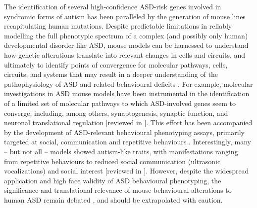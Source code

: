The identification of several high-confidence ASD-risk genes involved in
syndromic forms of autism \parencite{sanders2015} has been paralleled by the
generation of mouse lines recapitulating human mutations. Despite predictable
limitations in reliably modelling the full phenotypic spectrum of a complex (and
possibly only human) developmental disorder like ASD, mouse models can be
harnessed to understand how genetic alterations translate into relevant changes
in cells and circuits, and ultimately to identify points of convergence for
molecular pathways, cells, circuits, and systems that may result in a deeper
understanding of the pathophysiology of ASD and related behavioural deficits
\parencite{arguello2012, nelson2015, vasa2016}. For example, molecular
investigations in ASD mouse models have been instrumental in the identification
of a limited set of molecular pathways to which ASD-involved genes seem to
converge, including, among others, synaptogenesis, synaptic function, and
neuronal translational regulation [reviewed in
\parencite{delatorre-ubieta2016}]. This effort has been accompanied by the
development of ASD-relevant behavioural phenotyping assays, primarily targeted
at social, communication and repetitive behaviours \parencite{wohr2013, kas2014,
silverman2010, homberg2016}. Interestingly, many – but not all – models showed
autism-like traits, with manifestations ranging from repetitive behaviours to
reduced social communication (ultrasonic vocalizations) and social interest
[reviewed in \parencite{ellegood2015}]. However, despite the widespread
application and high face validity of ASD behavioural phenotyping, the
significance and translational relevance of mouse behavioural alterations to
human ASD remain debated \parencite{wohr2013}, and should be extrapolated with
caution. 

